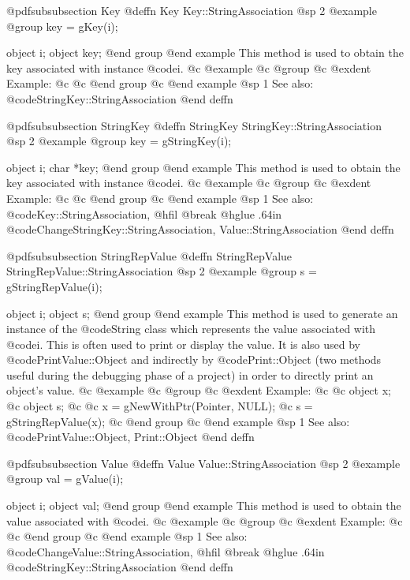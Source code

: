 @pdfsubsubsection {Key}
@deffn {Key} Key::StringAssociation
@sp 2
@example
@group
key = gKey(i);

object  i;
object  key;
@end group
@end example
This method is used to obtain the key associated with instance @code{i}.
@c @example
@c @group
@c @exdent Example:
@c 
@c @end group
@c @end example
@sp 1
See also:  @code{StringKey::StringAssociation}
@end deffn










@pdfsubsubsection {StringKey}
@deffn {StringKey} StringKey::StringAssociation
@sp 2
@example
@group
key = gStringKey(i);

object  i;
char    *key;
@end group
@end example
This method is used to obtain the key associated with instance @code{i}.
@c @example
@c @group
@c @exdent Example:
@c 
@c @end group
@c @end example
@sp 1
See also:  @code{Key::StringAssociation,}
@hfil @break @hglue .64in      @code{ChangeStringKey::StringAssociation, Value::StringAssociation}
@end deffn






@pdfsubsubsection {StringRepValue}
@deffn {StringRepValue} StringRepValue::StringAssociation
@sp 2
@example
@group
s = gStringRepValue(i);

object  i;
object  s;
@end group
@end example
This method is used to generate an instance of the @code{String} class
which represents the value associated with @code{i}.  This is often
used to print or display the value.  It is also used by
@code{PrintValue::Object} and indirectly by @code{Print::Object}
(two methods useful during the debugging phase of a project)
in order to directly print an object's value.
@c @example
@c @group
@c @exdent Example:
@c 
@c object  x;
@c object  s;
@c 
@c x = gNewWithPtr(Pointer, NULL);
@c s = gStringRepValue(x);
@c @end group
@c @end example
@sp 1
See also:  @code{PrintValue::Object, Print::Object}
@end deffn






@pdfsubsubsection {Value}
@deffn {Value} Value::StringAssociation
@sp 2
@example
@group
val = gValue(i);

object  i;
object  val;
@end group
@end example
This method is used to obtain the value associated with
@code{i}.
@c @example
@c @group
@c @exdent Example:
@c 
@c @end group
@c @end example
@sp 1
See also:  @code{ChangeValue::StringAssociation,}
@hfil @break @hglue .64in      @code{StringKey::StringAssociation}
@end deffn





